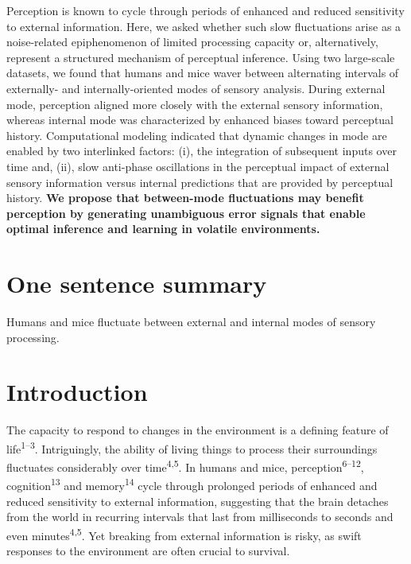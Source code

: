 \documentclass[
]{article}
\begin{document}
Perception is known to cycle through periods of enhanced and reduced
sensitivity to external information. Here, we asked whether such slow
fluctuations arise as a noise-related epiphenomenon of limited
processing capacity or, alternatively, represent a structured mechanism
of perceptual inference. Using two large-scale datasets, we found that
humans and mice waver between alternating intervals of externally- and
internally-oriented modes of sensory analysis. During external mode,
perception aligned more closely with the external sensory information,
whereas internal mode was characterized by enhanced biases toward
perceptual history. Computational modeling indicated that dynamic
changes in mode are enabled by two interlinked factors: (i), the
integration of subsequent inputs over time and, (ii), slow anti-phase
oscillations in the perceptual impact of external sensory information
versus internal predictions that are provided by perceptual history.
\textbf{We propose that between-mode fluctuations may benefit perception
by generating unambiguous error signals that enable optimal inference
and learning in volatile environments.}

\hypertarget{one-sentence-summary}{%
\section{One sentence summary}\label{one-sentence-summary}}

Humans and mice fluctuate between external and internal modes of sensory
processing.

\hfill\break

\newpage

\hypertarget{introduction}{%
\section{Introduction}\label{introduction}}

The capacity to respond to changes in the environment is a defining
feature of life\textsuperscript{1--3}. Intriguingly, the ability of
living things to process their surroundings fluctuates considerably over
time\textsuperscript{4,5}. In humans and mice,
perception\textsuperscript{6--12}, cognition\textsuperscript{13} and
memory\textsuperscript{14} cycle through prolonged periods of enhanced
and reduced sensitivity to external information, suggesting that the
brain detaches from the world in recurring intervals that last from
milliseconds to seconds and even minutes\textsuperscript{4,5}. Yet
breaking from external information is risky, as swift responses to the
environment are often crucial to survival.
\end{document}
